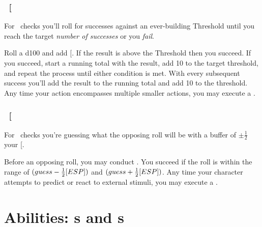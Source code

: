 \subsection{\SPEDful\ {[}\SPED\index{\attribute!\SPEDful}{]}}\label{subsec:spd}


\noindent For \SPEDful\ checks you'll roll for successes against an ever-building Threshold until you reach the target \textit{number of successes} or you \textit{fail}.

\noindent Roll a d100 and add {[}\SPED{]}. If the result is above the Threshold then you succeed. If you succeed, start a running total with the result, add 10 to the target threshold, and repeat the process until either condition is met. With every subsequent success you'll add the result to the running total and add 10 to the threshold. 
\fillrlinemid
\noindent Any time your action encompasses multiple smaller actions, you may execute a \SPED .


\subsection{\FOREful\ {[}\FORE\index{\attribute!\FOREful}{]}}\label{subsec:esp}


\noindent For \FOREful\ checks you're guessing what the opposing roll will be with a buffer of $\pm \frac{1}{2}$ your {[}\FORE{]}.

\noindent Before an opposing roll, you may conduct \FORE. You succeed if the roll is within the range of $(guess - \frac{1}{2}[ESP])$ and $(guess + \frac{1}{2}[ESP])$.
\fillrlinemid
\noindent Any time your character attempts to predict or react to external stimuli, you may execute a \FORE.


\chapter{Abilities: \skill s and \techn s}\label{ch:skills_and_tech}

